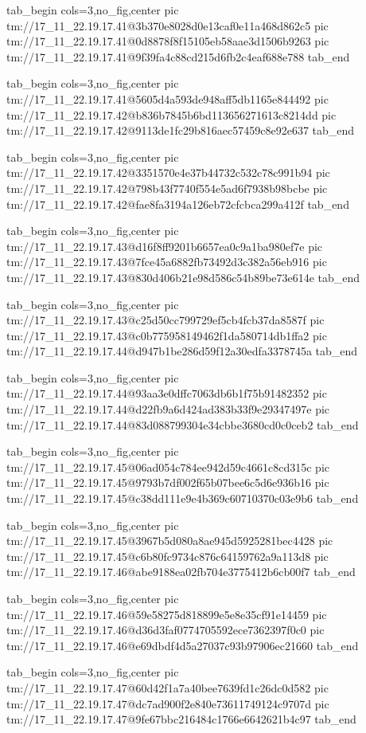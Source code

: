 \ifcmt
  tab_begin cols=3,no_fig,center
    pic tm://17_11_22.19.17.41@3b370e8028d0e13caf0e11a468d862c5
    pic tm://17_11_22.19.17.41@0d8878f8f15105eb58aae3d1506b9263
    pic tm://17_11_22.19.17.41@9f39fa4c88cd215d6fb2c4eaf688e788
  tab_end
\fi


\ifcmt
  tab_begin cols=3,no_fig,center
    pic tm://17_11_22.19.17.41@5605d4a593de948aff5db1165e844492
    pic tm://17_11_22.19.17.42@b836b7845b6bd113656271613c8214dd
    pic tm://17_11_22.19.17.42@9113de1fc29b816aec57459c8e92e637
  tab_end
\fi


\ifcmt
  tab_begin cols=3,no_fig,center
    pic tm://17_11_22.19.17.42@3351570e4e37b44732c532c78c991b94
    pic tm://17_11_22.19.17.42@798b43f7740f554e5ad6f7938b98bcbe
    pic tm://17_11_22.19.17.42@fae8fa3194a126eb72cfcbca299a412f
  tab_end
\fi


\ifcmt
  tab_begin cols=3,no_fig,center
    pic tm://17_11_22.19.17.43@d16f8ff9201b6657ea0c9a1ba980ef7e
    pic tm://17_11_22.19.17.43@7fce45a6882fb73492d3c382a56eb916
    pic tm://17_11_22.19.17.43@830d406b21e98d586c54b89be73e614e
  tab_end
\fi


\ifcmt
  tab_begin cols=3,no_fig,center
    pic tm://17_11_22.19.17.43@c25d50cc799729ef5cb4fcb37da8587f
    pic tm://17_11_22.19.17.43@c0b775958149462f1da580714db1ffa2
    pic tm://17_11_22.19.17.44@d947b1be286d59f12a30edfa3378745a
  tab_end
\fi


\ifcmt
  tab_begin cols=3,no_fig,center
    pic tm://17_11_22.19.17.44@93aa3e0dffc7063db6b1f75b91482352
    pic tm://17_11_22.19.17.44@d22fb9a6d424ad383b33f9e29347497e
    pic tm://17_11_22.19.17.44@83d088799304e34cbbe3680cd0c0ceb2
  tab_end
\fi


\ifcmt
  tab_begin cols=3,no_fig,center
    pic tm://17_11_22.19.17.45@06ad054c784ee942d59c4661c8cd315c
    pic tm://17_11_22.19.17.45@9793b7df002f65b07bee6c5d6e936b16
    pic tm://17_11_22.19.17.45@c38dd111e9e4b369c60710370c03e9b6
  tab_end
\fi


\ifcmt
  tab_begin cols=3,no_fig,center
    pic tm://17_11_22.19.17.45@3967b5d080a8ae945d5925281bec4428
    pic tm://17_11_22.19.17.45@c6b80fc9734c876c64159762a9a113d8
    pic tm://17_11_22.19.17.46@abe9188ea02fb704e3775412b6cb00f7
  tab_end
\fi


\ifcmt
  tab_begin cols=3,no_fig,center
    pic tm://17_11_22.19.17.46@59e58275d818899e5e8e35cf91e14459
    pic tm://17_11_22.19.17.46@d36d3faf0774705592ece7362397f0c0
    pic tm://17_11_22.19.17.46@e69dbdf4d5a27037c93b97906ec21660
  tab_end
\fi


\ifcmt
  tab_begin cols=3,no_fig,center
    pic tm://17_11_22.19.17.47@60d42f1a7a40bee7639fd1c26dc0d582
    pic tm://17_11_22.19.17.47@dc7ad900f2e840e73611749124c9707d
    pic tm://17_11_22.19.17.47@9fe67bbc216484c1766e6642621b4c97
  tab_end
\fi


